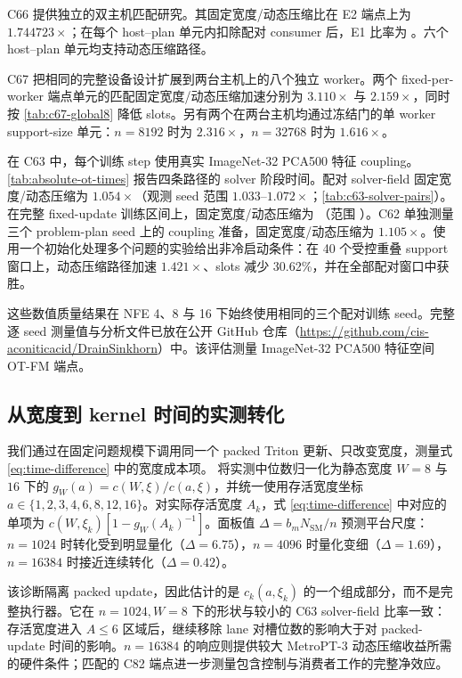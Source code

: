 C66 提供独立的双主机匹配研究。其固定宽度/动态压缩比在 E2 端点上为 $1.744723\times$；在每个 host--plan 单元内扣除配对 consumer 后，E1 比率为 \CMetroRetirementOTSpeedup{}。六个 host--plan 单元均支持动态压缩路径。

C67 把相同的完整设备设计扩展到两台主机上的八个独立 worker。两个 fixed-per-worker 端点单元的匹配固定宽度/动态压缩加速分别为 $3.110\times$ 与 $2.159\times$，同时按 \cref{tab:c67-global8} 降低 slots。另有两个在两台主机均通过冻结门的单 worker support-size 单元：$n=8192$ 时为 $2.316\times$，$n=32768$ 时为 $1.616\times$。



在 C63 中，每个训练 step 使用真实 ImageNet-32 PCA500 特征 coupling。\cref{tab:absolute-ot-times} 报告四条路径的 solver 阶段时间。配对 solver-field 固定宽度/动态压缩为 $1.054\times$（观测 seed 范围 $1.033$--$1.072\times$；\cref{tab:c63-solver-pairs}）。在完整 fixed-update 训练区间上，固定宽度/动态压缩为 \CFeatureTrainingActiveOverStatic{}（范围 \CFeatureTrainingActiveOverStaticRange{}）。C62 单独测量三个 problem-plan seed 上的 coupling 准备，固定宽度/动态压缩为 $1.105\times$。使用一个初始化处理多个问题的实验给出非冷启动条件：在 40 个受控重叠 support 窗口上，动态压缩路径加速 $1.421\times$、slots 减少 30.62\%，并在全部配对窗口中获胜。



这些数值质量结果在 NFE 4、8 与 16 下始终使用相同的三个配对训练 seed。完整逐 seed 测量值与分析文件已放在公开 GitHub 仓库（\url{https://github.com/cis-aconiticacid/DrainSinkhorn}）中。该评估测量 ImageNet-32 PCA500 特征空间 OT-FM 端点。

\subsection{从宽度到 kernel 时间的实测转化}

我们通过在固定问题规模下调用同一个 packed Triton 更新、只改变宽度，测量式 \eqref{eq:time-difference} 中的宽度成本项。 将实测中位数归一化为静态宽度 $W=8$ 与 $16$ 下的 $g_W(a)=c(W,\xi)/c(a,\xi)$，并统一使用存活宽度坐标 $a\in\{1,2,3,4,6,8,12,16\}$。对实际存活宽度 $A_k$，式 \eqref{eq:time-difference} 中对应的单项为 $c(W,\xi_k)[1-g_W(A_k)^{-1}]$。面板值 $\Delta=b_mN_{\mathrm{SM}}/n$ 预测平台尺度：$n=1024$ 时转化受到明显量化（$\Delta=6.75$），$n=4096$ 时量化变细（$\Delta=1.69$），$n=16384$ 时接近连续转化（$\Delta=0.42$）。

该诊断隔离 packed update，因此估计的是 $c_k(a,\xi_k)$ 的一个组成部分，而不是完整执行器。它在 $n=1024,W=8$ 下的形状与较小的 C63 solver-field 比率一致：存活宽度进入 $A\leq6$ 区域后，继续移除 lane 对槽位数的影响大于对 packed-update 时间的影响。$n=16384$ 的响应则提供较大 MetroPT-3 动态压缩收益所需的硬件条件；匹配的 C82 端点进一步测量包含控制与消费者工作的完整净效应。

